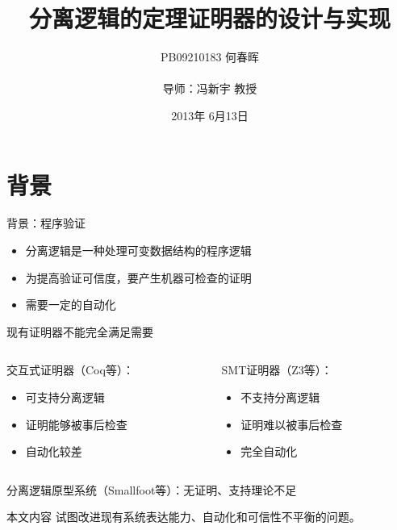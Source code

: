 \documentclass{beamer}
\title{分离逻辑的定理证明器的设计与实现}
\author{PB09210183 何春晖 \\ \hfill \\ 导师：冯新宇 教授}
\date{2013年 6月13日}
\begin{document}
\frame{\titlepage}

\section{背景}
\begin{frame}[fragile]
  \begin{block}{背景：程序验证}
    \begin{itemize}
    \item 分离逻辑是一种处理可变数据结构的程序逻辑
    \item 为提高验证可信度，要产生机器可检查的证明
    \item 需要一定的自动化
    \end{itemize}
  \end{block}
  \pause
  \begin{block}{现有证明器不能完全满足需要}
    \begin{columns}
      \begin{column}{0.45\textwidth}
        交互式证明器（Coq等）：
        \begin{itemize}
        \item 可支持分离逻辑
        \item 证明能够被事后检查
        \item 自动化较差
        \end{itemize}
      \end{column}
      \begin{column}{0.45\textwidth}
        SMT证明器（Z3等）：
        \begin{itemize}
        \item 不支持分离逻辑
        \item 证明难以被事后检查
        \item 完全自动化
        \end{itemize}
      \end{column}
    \end{columns}
    分离逻辑原型系统（Smallfoot等）：无证明、支持理论不足
  \end{block}
  \pause
  \begin{block}{本文内容}
    试图改进现有系统表达能力、自动化和可信性不平衡的问题。
  \end{block}
\end{frame}
\end{document}
